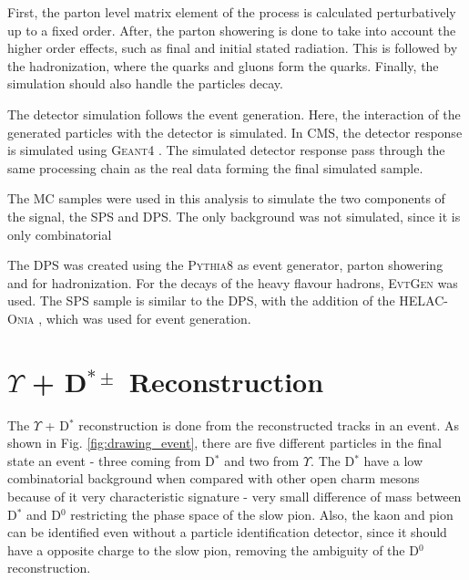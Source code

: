 First, the parton level matrix element of the process is calculated perturbatively up to a fixed order. After, the parton showering is done to take into account the higher order effects, such as final and initial stated radiation. This is followed by the hadronization, where the quarks and gluons form the quarks. Finally, the simulation should also handle the particles decay.

The detector simulation follows the event generation. Here, the interaction of the generated particles with the detector is simulated. In CMS, the detector response is simulated using \textsc{Geant4} \cite{GEANT4:2002zbu}. The simulated detector response pass through the same processing chain as the real data forming the final simulated sample.

The MC samples were used in this analysis to simulate the two components of the signal, the SPS and DPS. The only background was not simulated, since it is only combinatorial

The DPS was created using the \textsc{Pythia8} \cite{Sjostrand:2014zea} as event generator, parton showering and for hadronization. For the decays of the heavy flavour hadrons, \textsc{EvtGen} \cite{Lange:2001uf} was used. The SPS sample is similar to the DPS, with the addition of the \textsc{HELAC-Onia} \cite{Shao:2012iz, Shao:2015vga}, which was used for event generation.

\section{\texorpdfstring{$\Upsilon$ + D$^{*\pm}$}{Y+D*} Reconstruction}

The $\Upsilon$ + D$^*$ reconstruction is done from the reconstructed tracks in an event. As shown in Fig. \ref{fig:drawing_event}, there are five different particles in the final state an event - three coming from D$^*$ and two from $\Upsilon$. The D$^*$ have a low combinatorial background when compared with other open charm mesons because of it very characteristic signature - very small difference of mass between D$^*$ and D$^0$ restricting the phase space of the slow pion. Also, the kaon and pion can be identified even without a particle identification detector, since it should have a opposite charge to the slow pion, removing the ambiguity of the D$^0$ reconstruction.

